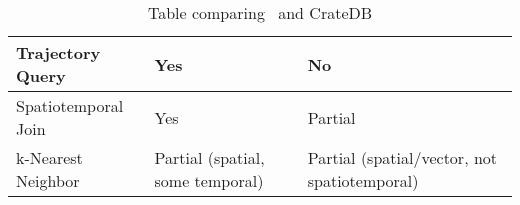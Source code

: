 \begin{table}[h]
\begin{tabular}{|P{3.3cm}|P{6cm}|P{4cm}|}
		\hline
		Trajectory Query                  & Yes                                                                 & No                                                     \\
		\hline
		Spatiotemporal Join               & Yes                                                                 & Partial                                                \\
		\hline
		k-Nearest Neighbor                & Partial (spatial, some temporal)                                    & Partial (spatial/vector, not spatiotemporal)           \\
		\hline
	\end{tabular}
	\caption{Table comparing \mobilitydbc~and CrateDB}
	\label{tab:mobilitydb_vs_cratedb}
\end{table}





